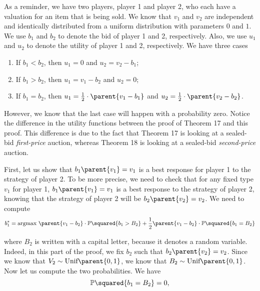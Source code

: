As a reminder, we have two players, player 1 and player 2, who each have a valuation for an item that is being sold. We know that $v_1$ and $v_2$ are independent and identically distributed from a uniform distribution with parameters $0$ and $1$. We use $b_1$ and $b_2$ to denote the bid of player 1 and 2, respectively. Also, we use $u_1$ and $u_2$ to denote the utility of player 1 and 2, respectively. We have three cases
\begin{enumerate}
    \item If $b_1 < b_2$, then $u_1 = 0$ and $u_2 = v_2 - b_1$;
    \item If $b_1 > b_2$, then $u_1 = v_1 - b_2$ and $u_2 = 0$;
    \item If $b_1 = b_2$, then $u_1 = \frac{1}{2} \cdot \parent{v_1 - b_1}$ and $u_2 = \frac{1}{2} \cdot \parent{v_2 - b_2}$.
\end{enumerate}

However, we know that the last case will happen with a probability zero.
Notice the difference in the utility functions between the proof of Theorem 17 and this proof. This difference is due to the fact that Theorem 17 is looking at a sealed-bid \textit{first-price} auction, whereas Theorem 18 is looking at a sealed-bid \textit{second-price} auction. 

\vspace{5mm}


First, let us show that $b_1 \parent{v_1} = v_1$ is a best response for player 1 to the strategy of player 2. To be more precise, we need to check that for any fixed type $v_1$ for player 1, $b_1 \parent{v_1} = v_1$ is a best response to the strategy of player 2, knowing that the strategy of player 2 will be $b_2 \parent{v_2} = v_2$.
We need to compute
\begin{equation*}
    b_1^{*}
    = \text{argmax} \ 
    \parent{v_1 - b_2} \cdot \mathbb{P} \squared{b_1 > B_2}
    + \dfrac{1}{2} \parent{v_1 - b_2} \cdot \mathbb{P} \squared{b_1 = B_2}
\end{equation*}

where $B_2$ is written with a capital letter, because it denotes a random variable. Indeed, in this part of the proof, we fix $b_2$ such that $b_2 \parent{v_2} = v_2$. Since we know that $V_2 \sim \text{Unif} \parent{0, 1}$, we know that $B_2 \sim \text{Unif} \parent{0, 1}$. Now let us compute the two probabilities. We have
\begin{equation*}
    \mathbb{P} \squared{b_1 = B_2}
    = 0,
\end{equation*}

